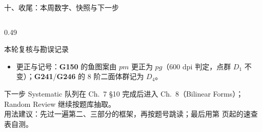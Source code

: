 \documentclass[aspectratio=169,10pt,fontset=none]{ctexbeamer}
\newcommand{\ex}[1]{\textcolor{accent}{\footnotesize\bfseries #1}}
\begin{document}
\begin{frame}[t]{十、收尾：本周数字、快照与下一步}
\begin{columns}[T,onlytextwidth]
\begin{column}{0.49\textwidth}
\begin{block}{\footnotesize 本轮复核与勘误记录}
\begin{itemize}
          \item 更正与记号：\ex{G150} 的鱼图案由 $pm$ 更正为 $pg$（600 dpi 判定，点群 $D_1$ 不变）；\ex{G241}/\ex{G246} 的 8 阶二面体群记为 $D_4$。
        \end{itemize}
      \end{block}
      \begin{exampleblock}{\footnotesize 下一步}
        \scriptsize
        Systematic 队列在 Ch.~7 \S10 完成后进入 Ch.~8（Bilinear Forms）；Random Review 继续按题库抽取。\\
        用法建议：先过一遍第二、三部分的框架，再按题号跳读；最后用第 \pageref{sec:answers} 页起的速查表自测。
      \end{exampleblock}
    \end{column}
  \end{columns}
\end{frame}
\end{document}
